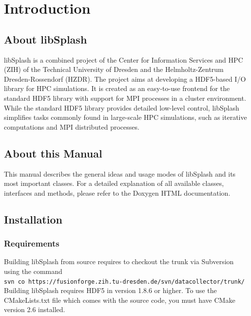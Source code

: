 \documentclass[a4paper,10pt,BCOR12mm]{report}
\newcommand{\command}[1]{\small \texttt{#1}}
\begin{document}
\tableofcontents

\newpage


\chapter{Introduction}

\section{About libSplash}

libSplash is a combined project of the Center for Information Services and HPC (ZIH) of the Technical University of Dresden and the Helmholtz-Zentrum Dresden-Rossendorf (HZDR).
The project aims at developing a HDF5-based I/O library for HPC simulations. It is created as an easy-to-use frontend for the standard HDF5 library with support for MPI processes in a cluster environment.
While the standard HDF5 library provides detailed low-level control, libSplash simplifies tasks commonly found in large-scale HPC simulations, such as iterative computations and MPI distributed processes.

\section{About this Manual}

This manual describes the general ideas and usage modes of libSplash and its most important classes.
For a detailed explanation of all available classes, interfaces and methods, please refer to the
Doxygen HTML documentation.

\newpage

\section{Installation}

\subsection{Requirements}

Building libSplash from source requires to checkout the trunk via Subversion using the command\\
\command{svn co https://fusionforge.zih.tu-dresden.de/svn/datacollector/trunk/}
Building libSplash requires HDF5 in version 1.8.6 or higher.
To use the CMakeLists.txt file which comes with the source code,
you must have CMake version 2.6 installed.
\end{document}
